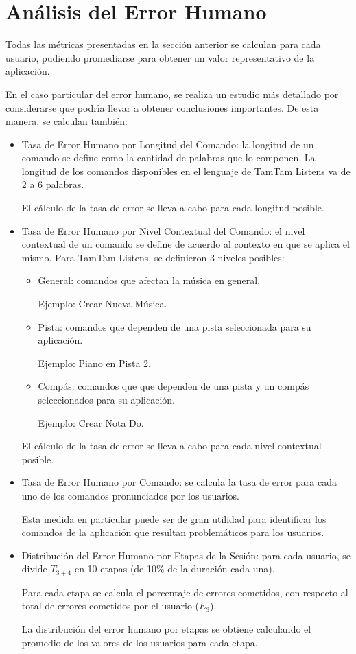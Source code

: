 \section{An\'alisis del Error Humano}
\label{sec:evaluacionError}
Todas las m\'etricas presentadas en la secci\'on anterior se calculan para cada usuario,
pudiendo promediarse para obtener un valor representativo de la aplicaci\'on.

En el caso particular del error humano, se realiza un estudio m\'as detallado
por considerarse que podr{\'\i}a llevar a obtener conclusiones importantes. 
De esta manera, se calculan tambi\'en:

\begin{itemize}
	\item Tasa de Error Humano por Longitud del Comando: la longitud de un comando se define
	como la cantidad de palabras que lo componen. La longitud de los comandos disponibles en el 
	lenguaje de TamTam Listens va de 2 a 6 palabras.

	El c\'alculo de la tasa de error se lleva a cabo para cada longitud posible.  


	\item Tasa de Error Humano por Nivel Contextual del Comando: el nivel contextual de un comando
	se define de acuerdo al contexto en que se aplica el mismo.
	Para TamTam Listens, se definieron 3 niveles posibles:
		\begin{itemize}
			\item General: comandos que afectan la m\'usica en general. 

			Ejemplo: Crear Nueva M\'usica.
			\item Pista: comandos que dependen de una pista seleccionada para su aplicaci\'on. 

			Ejemplo: Piano en Pista 2.
			\item Comp\'as: comandos que que dependen de una pista y un comp\'as seleccionados 
			para su aplicaci\'on. 

			Ejemplo: Crear Nota Do.
		\end{itemize}
	
		
	El c\'alculo de la tasa de error se lleva a cabo para cada nivel contextual posible.

	\item Tasa de Error Humano por Comando: se calcula la tasa de error para cada uno
	de los comandos pronunciados por los usuarios.

	Esta medida en particular puede ser de gran utilidad para identificar los comandos de la
	aplicaci\'on que resultan problem\'aticos para los usuarios.
	
	\item Distribuci\'on del Error Humano por Etapas de la Sesi\'on: para cada usuario, 
	se divide $T_{3+4}$ en 10 etapas (de 10\% de la duraci\'on cada una).

	Para cada etapa se calcula el porcentaje de errores cometidos, con respecto al total de
	errores cometidos por el usuario ($E_3$).

	La distribuci\'on del error humano por etapas se obtiene calculando 
	el promedio de los valores de los usuarios para cada etapa.
   
\end{itemize}